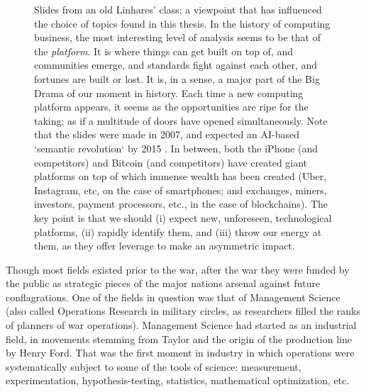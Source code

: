 \begin{figure}[!p]

\caption{Slides from an old Linhares' class; a viewpoint that has influenced the choice of topics found in this thesis.   In the history of computing business, the most interesting level of analysis seems to be that of the \emph{platform}.  It is where things can get built on top of, and communities emerge, and standards fight against each other, and fortunes are built or lost.  It is, in a sense, a major part of the Big Drama of our moment in history. Each time a new computing platform appears, it seems as the opportunities are ripe for the taking; as if a multitude of doors have opened simultaneously.  Note that the slides were made in 2007, and expected an AI-based `semantic revolution` by 2015 \citep{only-one-life}.  In between, both the iPhone (and competitors) and Bitcoin (and competitors) have created giant platforms on top of which immense wealth has been created (Uber, Instagram, etc, on the case of smartphones; and exchanges, miners, investors, payment processors, etc., in the case of blockchains).  The key point is that we should (i) expect new, unforeseen, technological platforms, (ii) rapidly identify them, and (iii) throw our energy at them, as they offer leverage to make an asymmetric impact.
\label{fig:onelife}}
\end{figure}

Though most fields existed prior to the war, after the war they were funded by the public as strategic pieces of the major nations arsenal against future conflagrations. One of the fields in question was that of Management Science (also called Operations Research in military circles, as researchers filled the ranks of planners of war operations). Management Science had started as an industrial field, in movements stemming from Taylor and the origin of the production line by Henry Ford.  That was the first moment in industry in which operations were systematically subject to some of the tools of science: measurement, experimentation, hypothesis-testing, statistics, mathematical optimization, etc.

